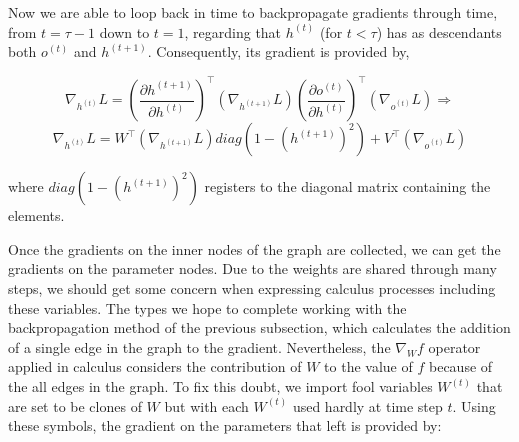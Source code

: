 Now we are able to loop back in time to backpropagate gradients through time, from $t = \tau - 1$ down to $t = 1$,
regarding that $h^{(t)}$ (for $t < \tau$) has as descendants both $o^{(t)}$ and $h^{(t+1)}$.
Consequently, its gradient is provided by,

\begin{equation}
    \nabla_{h^{(t)}} L = (\frac{\partial h^{(t+1)}}{\partial h^{(t)}})^\top (\nabla_{h^{(t+1)}} L) (\frac{\partial o^{(t)}}{\partial h^{(t)}})^\top (\nabla_{o^{(t)}} L) \Rightarrow\label{eq:equation13}
\end{equation}
\begin{equation}
    \nabla_{h^{(t)}} L = W^\top (\nabla_{h^{(t+1)}} L) diag(1-(h^{(t+1)})^2) + V^\top (\nabla_{o^{(t)}} L)\label{eq:equation14}
\end{equation}

where $diag(1-(h^{(t+1)})^2)$ registers to the diagonal matrix containing the elements.

Once the gradients on the inner nodes of the graph are collected, we can get the gradients on the parameter nodes.
Due to the weights are shared through many steps, we should get some concern when expressing calculus processes including these variables.
The types we hope to complete working with the backpropagation method of the previous subsection,
which calculates the addition of a single edge in the graph to the gradient.
Nevertheless, the $\nabla_W f$ operator applied in calculus considers the contribution of $W$ to the value of $f$ because of the all edges in the graph.
To fix this doubt, we import fool variables $W^{(t)}$ that are set to be clones of $W$ but with each $W^{(t)}$ used hardly at time step $t$.
Using these symbols, the gradient on the parameters that left is provided by:

